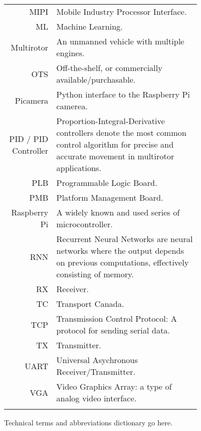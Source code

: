 \begin{tabular}[h]{rp{0.75\linewidth}}
    MIPI & Mobile Industry Processor Interface. \\
    ML & Machine Learning.\\
    Multirotor & An unmanned vehicle with multiple engines. \\
    OTS & Off-the-shelf, or commercially available/purchasable. \\
    Picamera & Python interface to the Raspberry Pi camerea. \\
    PID / PID Controller & Proportion-Integral-Derivative controllers denote the most common control algorithm for precise and accurate movement in multirotor applications.\cite{pid}\\
    PLB & Programmable Logic Board. \\
    PMB & Platform Management Board. \\
    Raspberry Pi & A widely known and used series of microcontroller. \\
    RNN & Recurrent Neural Networks are neural networks where the output depends on previous computations, effectively consisting of memory.\cite{rnn}\\
    RX & Receiver.\\
    TC & Transport Canada.\\
    TCP & Transmission Control Protocol: A protocol for sending serial data. \\
    TX & Transmitter.\\\
    UART & Universal Asychronous Receiver/Transmitter. \\
    VGA & Video Graphics Array: a type of analog video interface. \\
     & \\

    \hline

\end{tabular}

Technical terms and abbreviations dictionary go here.
